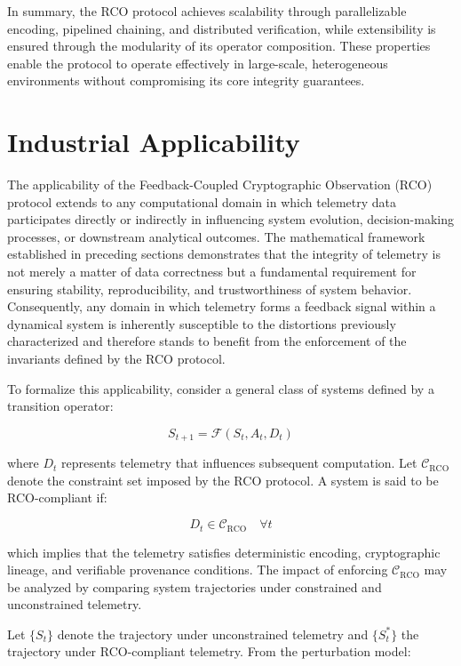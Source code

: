 In summary, the RCO protocol achieves scalability through parallelizable encoding, pipelined chaining, and distributed verification, while extensibility is ensured through the modularity of its operator composition. These properties enable the protocol to operate effectively in large-scale, heterogeneous environments without compromising its core integrity guarantees.

\section{Industrial Applicability}

The applicability of the Feedback-Coupled Cryptographic Observation (RCO) protocol extends to any computational domain in which telemetry data participates directly or indirectly in influencing system evolution, decision-making processes, or downstream analytical outcomes. The mathematical framework established in preceding sections demonstrates that the integrity of telemetry is not merely a matter of data correctness but a fundamental requirement for ensuring stability, reproducibility, and trustworthiness of system behavior. Consequently, any domain in which telemetry forms a feedback signal within a dynamical system is inherently susceptible to the distortions previously characterized and therefore stands to benefit from the enforcement of the invariants defined by the RCO protocol.

To formalize this applicability, consider a general class of systems defined by a transition operator:

\begin{equation}
S_{t+1} = \mathcal{F}(S_t, A_t, D_t)
\end{equation}

where $D_t$ represents telemetry that influences subsequent computation. Let $\mathcal{C}_{\text{RCO}}$ denote the constraint set imposed by the RCO protocol. A system is said to be RCO-compliant if:

\begin{equation}
D_t \in \mathcal{C}_{\text{RCO}} \quad \forall t
\end{equation}

which implies that the telemetry satisfies deterministic encoding, cryptographic lineage, and verifiable provenance conditions. The impact of enforcing $\mathcal{C}_{\text{RCO}}$ may be analyzed by comparing system trajectories under constrained and unconstrained telemetry.

Let $\{S_t\}$ denote the trajectory under unconstrained telemetry and $\{S_t^*\}$ the trajectory under RCO-compliant telemetry. From the perturbation model:


